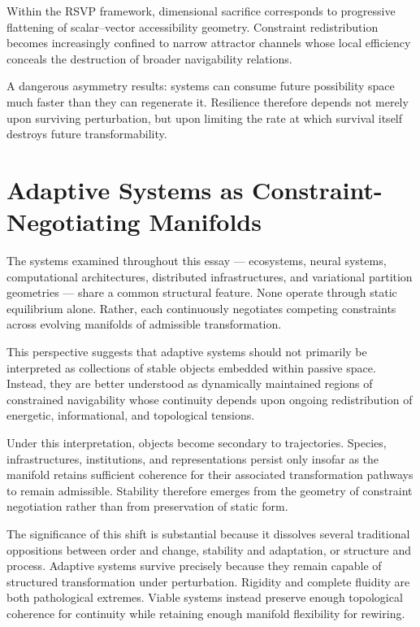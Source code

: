 \documentclass[11pt,a4paper]{article}
\begin{document}
Within the RSVP framework, dimensional sacrifice corresponds to progressive flattening of scalar--vector accessibility geometry. Constraint redistribution becomes increasingly confined to narrow attractor channels whose local efficiency conceals the destruction of broader navigability relations.

A dangerous asymmetry results: systems can consume future possibility space much faster than they can regenerate it. Resilience therefore depends not merely upon surviving perturbation, but upon limiting the rate at which survival itself destroys future transformability.


\newpage

\section{Adaptive Systems as Constraint-Negotiating Manifolds}

The systems examined throughout this essay --- ecosystems, neural systems, computational architectures, distributed infrastructures, and variational partition geometries --- share a common structural feature. None operate through static equilibrium alone. Rather, each continuously negotiates competing constraints across evolving manifolds of admissible transformation.

This perspective suggests that adaptive systems should not primarily be interpreted as collections of stable objects embedded within passive space. Instead, they are better understood as dynamically maintained regions of constrained navigability whose continuity depends upon ongoing redistribution of energetic, informational, and topological tensions.

Under this interpretation, objects become secondary to trajectories. Species, infrastructures, institutions, and representations persist only insofar as the manifold retains sufficient coherence for their associated transformation pathways to remain admissible. Stability therefore emerges from the geometry of constraint negotiation rather than from preservation of static form.

The significance of this shift is substantial because it dissolves several traditional oppositions between order and change, stability and adaptation, or structure and process. Adaptive systems survive precisely because they remain capable of structured transformation under perturbation. Rigidity and complete fluidity are both pathological extremes. Viable systems instead preserve enough topological coherence for continuity while retaining enough manifold flexibility for rewiring.
\end{document}
